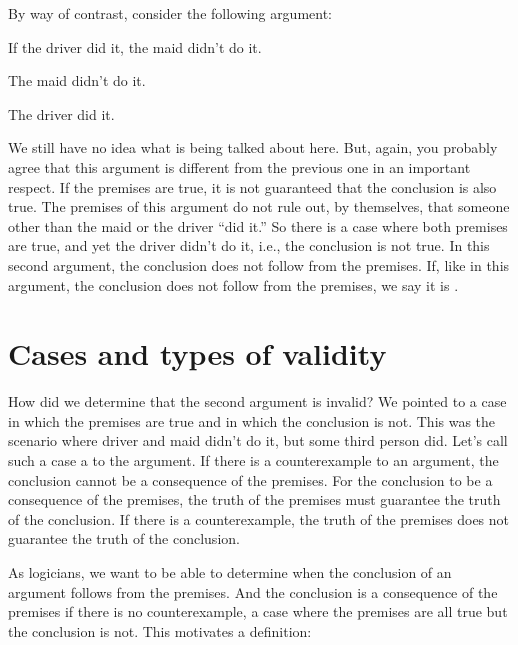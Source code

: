 By way of contrast, consider the following argument:
\begin{earg}\label{argMaidDriver}
	\item[] If the driver did it, the maid didn't do it.
	\item[] The maid didn't do it.
	\item[\therefore] The driver did it.
\end{earg}
We still have no idea what is being talked about here. But, again, you probably agree that this argument is different from the previous one in an important respect. If the premises are true, it is not guaranteed that the conclusion is also true. The premises of this argument do not rule out, by themselves, that someone other than the maid or the driver ``did it.'' So there is a case where both premises are true, and yet the driver didn't do it, i.e., the conclusion is not true. In this second argument, the conclusion does not follow from the premises. If, like in this argument, the conclusion does not follow from the premises, we say it is .

\section{Cases and types of validity}

How did we determine that the second argument is invalid? We pointed to a case in which the premises are true and in which the conclusion is not.  This was the scenario where driver and maid didn't do it, but some third person did.  Let's call such a case a  to the argument. If there is a counterexample to an argument, the conclusion cannot be a consequence of the premises. For the conclusion to be a consequence of the premises, the truth of the premises must guarantee the truth of the conclusion. If there is a counterexample, the truth of the premises does not guarantee the truth of the conclusion.

As logicians, we want to be able to determine when the conclusion of an argument follows from the premises. And the conclusion is a consequence of the premises if there is no counterexample, a case where the premises are all true but the conclusion is not. This motivates a definition:


